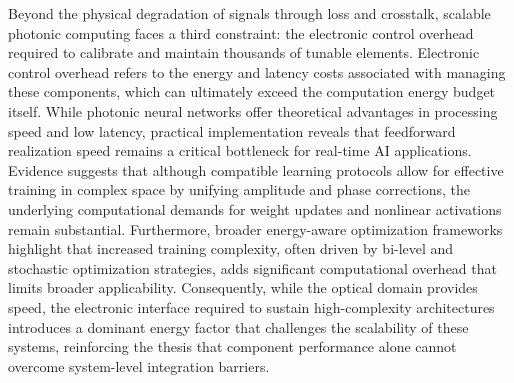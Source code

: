 \documentclass[11pt]{article}
\begin{document}
Beyond the physical degradation of signals through loss and crosstalk, scalable photonic computing faces a third constraint: the electronic control overhead required to calibrate and maintain thousands of tunable elements. Electronic control overhead refers to the energy and latency costs associated with managing these components, which can ultimately exceed the computation energy budget itself. \citep{doi_10_1364_oe_26_010914_a68558fb} \citep{doi_10_1109_jphot_2026_3695696_63cd0e68} While photonic neural networks offer theoretical advantages in processing speed and low latency, practical implementation reveals that feedforward realization speed remains a critical bottleneck for real-time AI applications. Evidence suggests that although compatible learning protocols allow for effective training in complex space by unifying amplitude and phase corrections, the underlying computational demands for weight updates and nonlinear activations remain substantial. Furthermore, broader energy-aware optimization frameworks highlight that increased training complexity, often driven by bi-level and stochastic optimization strategies, adds significant computational overhead that limits broader applicability. Consequently, while the optical domain provides speed, the electronic interface required to sustain high-complexity architectures introduces a dominant energy factor that challenges the scalability of these systems, reinforcing the thesis that component performance alone cannot overcome system-level integration barriers. \citep{doi_10_55041_ijsrem43509_b9a7bd5e} \citep{s2_b765388f3cc18d6e5a0507522822def0e3503ec6_fa09b483}
\end{document}

